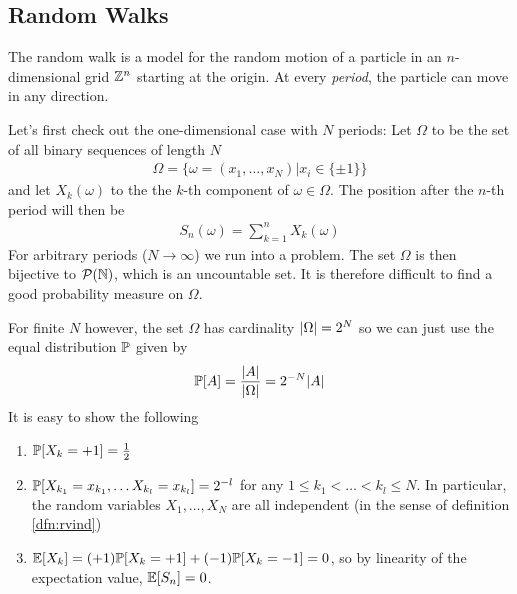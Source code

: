  
\subsection{Random Walks}
The random walk is a model for the random motion of a particle in an $n$-dimensional grid $\mathbb{Z}^{n}$ starting at the origin.
At every \emph{period}, the particle can move in any direction.

Let's first check out the one-dimensional case with $N$ periods:
Let $\Omega$ to be the set of all binary sequences of length $N$
\begin{align*}
  \Omega = \{\omega = (x_{1}, \ldots, x_{N}) \big\vert x_i \in \{\pm 1\}\}
\end{align*}
and let $X_k(\omega)$ to the the $k$-th component of $\omega \in \Omega$.
The position after the $n$-th period will then be
\begin{align*}
  S_n(\omega) = \sum_{k=1}^{n} X_k(\omega)
\end{align*}
For arbitrary periods ($N \to \infty$) we run into a problem. 
The set $\Omega$ is then bijective to $\mathcal{P}(\mathbb{N})$, which is an uncountable set.
It is therefore difficult to find a good probability measure on $\Omega$.

For finite $N$ however, the set $\Omega$ has cardinality $\vert\Omega\vert = 2^{N}$ so we can just use the equal distribution $\mathbb{P}$ given by
\begin{align*}
  \mathbb{P}[A] = \frac{\vert A\vert}{\vert\Omega\vert} = 2^{-N} \vert A\vert
\end{align*}
It is easy to show the following
\begin{enumerate}
  \item $\mathbb{P}[X_k = +1] = \frac{1}{2}$
  \item $\mathbb{P}[X_{k_1}=x_{k_1}, \ldots X_{k_l} = x_{k_l}] = 2^{-l}$ for any $1 \leq k_{1} < \ldots < k_{l} \leq N$.
    In particular, the random variables $X_{1}, \ldots, X_{N}$ are all independent (in the sense of definition \ref{dfn:rvind})
  \item $\mathbb{E}[X_k] = (+1) \mathbb{P}[X_k = +1] + (-1)\mathbb{P}[X_k = -1] = 0$, so by linearity of the expectation value, $\mathbb{E}[S_n] = 0$.
\end{enumerate}

